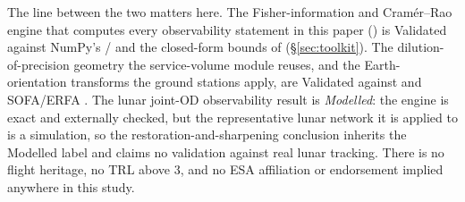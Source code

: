 The line between the two matters here. The Fisher-information and Cram\'er--Rao
engine that computes every observability statement in this paper
() is Validated against NumPy's / and the
closed-form bounds of \citet{kay1993} (\S\ref{sec:toolkit}). The dilution-of-precision
geometry the service-volume module reuses, and the Earth-orientation transforms
the ground stations apply, are Validated against 
\citep{knowles2024gnsslibpy} and SOFA/ERFA \citep{iausofa}. The lunar joint-OD
observability result is \emph{Modelled}: the engine is exact and externally
checked, but the representative lunar network it is applied to is a simulation, so
the restoration-and-sharpening conclusion inherits the Modelled label and claims
no validation against real lunar tracking. There is no flight heritage, no TRL
above 3, and no ESA affiliation or endorsement implied anywhere in this study.

